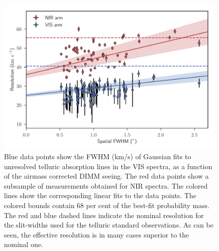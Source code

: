 \documentclass[longauth]{aa}    %
\begin{document}


\begin{figure}[!t]
	\centerline{\includegraphics[width=\columnwidth]{figures/resolutuions}} \caption{Blue
		data points show the FWHM (km/s) of Gaussian fits to unresolved telluric
		absorption lines in the VIS spectra, as a function of the airmass corrected
		DIMM seeing. The red data points show a subsample of measurements obtained for
		NIR spectra. The colored lines show the corresponding linear fits to the
		data points. The colored bounds contain 68 per cent of the best-fit probability
		mass. The red and blue dashed lines indicate the nominal resolution for the
		slit-widths used for the telluric standard observations. As can be seen, the
		effective resolution is in many cases superior to the nominal one.}
	\label{fig:res}
\end{figure}
\end{document}
